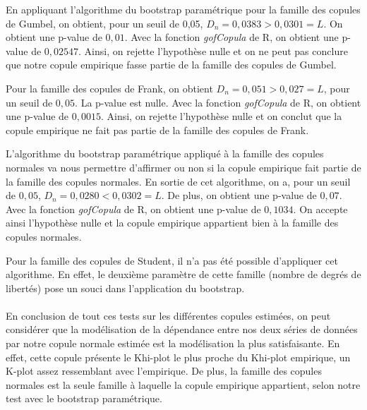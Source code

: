 En appliquant l'algorithme du bootstrap paramétrique pour la famille des copules de Gumbel, on obtient, pour un seuil de 0,05, $D_n = 0,0383 > 0,0301 = L$. On obtient une p-value de $0,01$. Avec la fonction \textit{gofCopula} de R, on obtient une p-value de $0,02547$. 
Ainsi, on rejette l'hypothèse nulle et on ne peut pas conclure que notre copule empirique fasse partie de la famille des copules de Gumbel.

Pour la famille des copules de Frank, on obtient $D_n = 0,051 > 0,027 = L$, pour un seuil de $0,05$. La p-value est nulle. Avec la fonction \textit{gofCopula} de R, on obtient une p-value de $0,0015$. 
Ainsi, on rejette l'hypothèse nulle et on conclut que la copule empirique ne fait pas partie de la famille des copules de Frank.

L'algorithme du bootstrap paramétrique appliqué à la famille des copules normales va nous permettre d'affirmer ou non si la copule empirique fait partie de la famille des copules normales. En sortie de cet algorithme, on a, pour un seuil de $0,05$, $D_n = 0,0280 < 0,0302 = L$. De plus, on obtient une p-value de $0,07$. Avec la fonction \textit{gofCopula} de R, on obtient une p-value de $0,1034$. 
On accepte ainsi l'hypothèse nulle et la copule empirique appartient bien à la famille des copules normales.

Pour la famille des copules de Student, il n'a pas été possible d'appliquer cet algorithme. En effet, le deuxième paramètre de cette famille (nombre de degrés de libertés) pose un souci dans l'application du bootstrap. \\ \\


En conclusion de tout ces tests sur les différentes copules estimées, on peut considérer que la modélisation de la dépendance entre nos deux séries de données par notre copule normale estimée est la modélisation la plus satisfaisante. En effet, cette copule présente le Khi-plot le plus proche du Khi-plot empirique, un K-plot assez ressemblant avec l'empirique. De plus, la famille des copules normales est la seule famille à laquelle la copule empirique appartient, selon notre test avec le bootstrap paramétrique.




